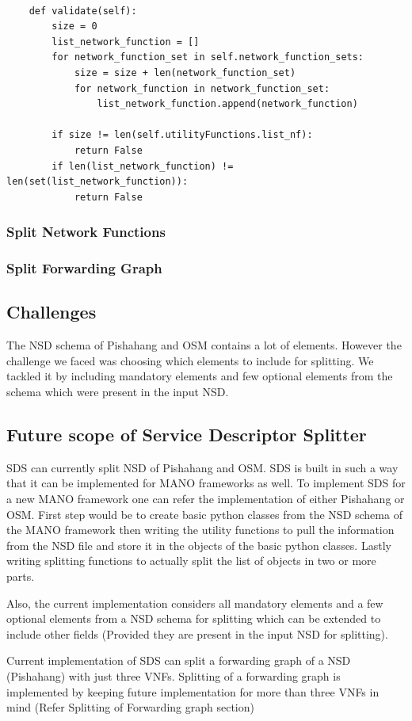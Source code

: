 \begin{lstlisting}[caption=Splitting Request Validation, label=lis:validation]

    def validate(self):
        size = 0
        list_network_function = []
        for network_function_set in self.network_function_sets:
            size = size + len(network_function_set)
            for network_function in network_function_set:
                list_network_function.append(network_function)

        if size != len(self.utilityFunctions.list_nf):
            return False
        if len(list_network_function) != len(set(list_network_function)):
            return False

\end{lstlisting}

\subsubsection{Split Network Functions}
\subsubsection{Split Forwarding Graph}

\subsection{Challenges}
The NSD schema of Pishahang and OSM contains a lot of elements. However the challenge we faced was choosing which elements to include for splitting. We tackled it by including mandatory elements and few optional elements from the schema which were present in the input NSD.
\subsection{Future scope of Service Descriptor Splitter}
SDS can currently split NSD of Pishahang and OSM. SDS is built in such a way that it can be implemented for MANO frameworks as well. To implement SDS for a new MANO framework one can refer the implementation of either Pishahang or OSM. First step would be to create basic python classes from the NSD schema of the MANO framework then writing the utility functions to pull the information from the NSD file and store it in the objects of the basic python classes. Lastly writing splitting functions to actually split the list of objects in two or more parts.

Also, the current implementation considers all mandatory elements and a few optional elements from a NSD schema for splitting which can be extended to include other fields (Provided they are present in the input NSD for splitting).

Current implementation of SDS can split a forwarding graph of a NSD (Pishahang) with just three VNFs. Splitting of a forwarding graph is implemented by keeping future implementation for more than three VNFs in mind (Refer Splitting of Forwarding graph section)



